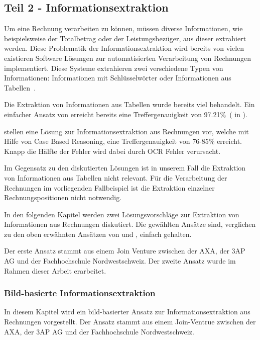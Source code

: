 \subsection{Teil 2 - Informationsextraktion}



Um eine Rechnung verarbeiten zu können, müssen diverse Informationen, wie beispielsweise der Totalbetrag oder der Leistungsbezüger, aus dieser extrahiert werden. Diese Problematik der Informationsextraktion wird bereits von vielen existieren Software Lösungen zur automatisierten Verarbeitung von Rechnungen implementiert. Diese Systeme extrahieren zwei verschiedene Typen von Informationen: Informationen mit Schlüsselwörter oder Informationen aus Tabellen~\autocite{Hamza}.

Die Extraktion von Informationen aus Tabellen wurde bereits viel behandelt. Ein einfacher Ansatz von \textcite{Mandal} erreicht bereits eine Treffergenauigkeit von 97.21\%~(\cite{Mandal} in \cite{Hamza}).

\textcite{Hamza} stellen eine Lösung zur Informationsextraktion aus Rechnungen vor, welche mit Hilfe von Case Based Reasoning, eine Treffergenauigkeit von 76-85\% erreicht. Knapp die Hälfte der Fehler wird dabei durch OCR Fehler verursacht.

Im Gegensatz zu den diskutierten Lösungen ist in unserem Fall die Extraktion von Informationen aus Tabellen nicht relevant. Für die Verarbeitung der Rechnungen im vorliegenden Fallbeispiel ist die Extraktion einzelner Rechnungspositionen nicht notwendig.

In den folgenden Kapitel werden zwei Lösungsvorschläge zur Extraktion von Informationen aus Rechnungen diskutiert. Die gewählten Ansätze sind, verglichen zu den oben erwähnten Ansätzen von \textcite{Mandal} und \textcite{Hamza}, einfach gehalten. 

Der erste Ansatz stammt aus einem Join Venture zwischen der AXA, der 3AP AG und der Fachhochschule Nordwestschweiz. Der zweite Ansatz wurde im Rahmen dieser Arbeit erarbeitet.

\subsubsection{Bild-basierte Informationsextraktion}

In diesem Kapitel wird ein bild-basierter Ansatz zur Informationsextraktion aus Rechnungen vorgestellt. Der Ansatz stammt aus einem Join-Ventrue zwischen der AXA, der 3AP AG und der Fachhochschule Nordwestschweiz. 

